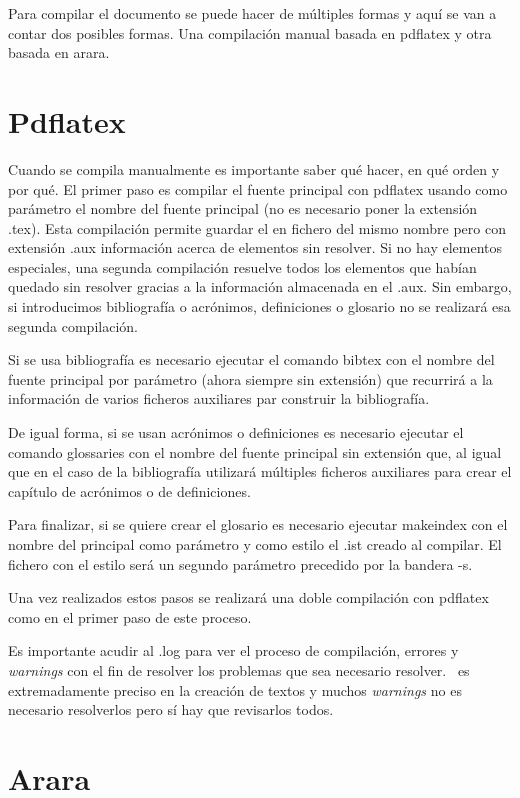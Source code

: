Para compilar el documento se puede hacer de múltiples formas y aquí se van a contar dos posibles formas. Una compilación manual basada en pdflatex y otra basada en arara.

\section{Pdflatex}

Cuando se compila manualmente es importante saber qué hacer, en qué orden y por qué. El primer paso es compilar el fuente principal con pdflatex usando como parámetro el nombre del fuente principal (no es necesario poner la extensión .tex). Esta compilación permite guardar el en fichero del mismo nombre pero con extensión .aux información acerca de elementos sin resolver. Si no hay elementos especiales, una segunda compilación resuelve todos los elementos que habían quedado sin resolver gracias a la información almacenada en el .aux. Sin embargo, si introducimos bibliografía o acrónimos, definiciones o glosario no se realizará esa segunda compilación.

Si se usa bibliografía es necesario ejecutar el comando bibtex con el nombre del fuente principal por parámetro (ahora siempre sin extensión) que recurrirá a la información de varios ficheros auxiliares par construir la bibliografía.

De igual forma, si se usan acrónimos o definiciones es necesario ejecutar el comando glossaries con el nombre del fuente principal sin extensión que, al igual que en el caso de la bibliografía utilizará múltiples ficheros auxiliares para crear el capítulo de acrónimos o de definiciones.

Para finalizar, si se quiere crear el glosario es necesario ejecutar makeindex con el nombre del principal como parámetro y como estilo el .ist creado al compilar. El fichero con el estilo será un segundo parámetro precedido por la bandera -s.

Una vez realizados estos pasos se realizará una doble compilación con pdflatex como en el primer paso de este proceso.

Es importante acudir al .log para ver el proceso de compilación, errores y \textit{warnings} con el fin de resolver los problemas que sea necesario resolver. \LaTeXe\ es extremadamente preciso en la creación de textos y muchos \textit{warnings} no es necesario resolverlos pero sí hay que revisarlos todos.

\section{Arara}

